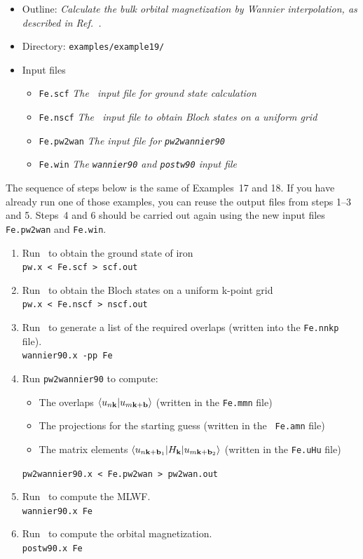 \documentclass[a4paper,11pt,twoside]{article}
\begin{document}
\begin{itemize}
\item{Outline: \it{Calculate the bulk orbital magnetization by Wannier
      interpolation, as described in Ref.~\cite{lopez-prb12}.}}
\item{Directory: {\tt examples/example19/}}
\item{Input files}
\begin{itemize}
\item{ {\tt Fe.scf} {\it The \pwscf\ input file for ground state
    calculation}}
\item{ {\tt Fe.nscf}  {\it The \pwscf\ input file to obtain Bloch
    states on a uniform grid}} 
\item{ {\tt Fe.pw2wan}  {\it The input file for {\tt pw2wannier90}}}
\item{ {\tt Fe.win}  {\it The {\tt wannier90} and {\tt postw90} input file}}
\end{itemize}
\end{itemize}

The sequence of steps below is the same of Examples~17 and 18.  If you
have already run one of those examples, you can reuse the output files
from steps 1--3 and 5. Steps~4 and 6 should be carried out again using
the new input files {\tt Fe.pw2wan} and {\tt Fe.win}.

\begin{enumerate}
\item Run \pwscf\ to obtain the ground state of iron\\
{\tt pw.x < Fe.scf > scf.out}

\item Run \pwscf\ to obtain the Bloch states on a uniform k-point
  grid\\ 
{\tt pw.x < Fe.nscf > nscf.out}

\item Run \wannier\ to generate a list of the required overlaps (written
  into the {\tt Fe.nnkp} file).\\
{\tt wannier90.x -pp Fe}


\item Run {\tt pw2wannier90} to compute:
  \begin{itemize}
  \item{The overlaps $\langle u_{n{\bf k}}\vert u_{m{\bf k}+{\bf
          b}}\rangle$ (written in the {\tt Fe.mmn} file)}
  \item{The projections for the starting guess (written in the {\tt
        Fe.amn} file)}
  \item{The matrix elements $\langle u_{n{\bf k}+{\bf b}_1}\vert
      H_{\bf k}\vert u_{m{\bf k}+{\bf b}_2}\rangle$ (written in the
      {\tt Fe.uHu} file)}
  \end{itemize}
{\tt pw2wannier90.x < Fe.pw2wan > pw2wan.out}

\item Run \wannier\ to compute the MLWF.\\
{\tt wannier90.x Fe}

\item Run \postw\ to compute the orbital magnetization.\\
{\tt postw90.x Fe}


\end{enumerate}
\end{document}
